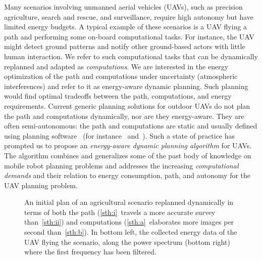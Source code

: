 \documentclass[letterpaper,10pt,conference]{ieeeconf}
\newcommand{\figpath}{./figures}
\theoremstyle{definition}
\begin{document}
Many scenarios involving unmanned aerial vehicles (UAVs), such as precision agriculture, search and rescue, and surveillance, require high autonomy but have limited energy budgets. A typical example of these scenarios is a UAV flying a path and performing some on-board computational tasks. For instance, the UAV might detect ground patterns and notify other ground-based actors with little human interaction. We refer to such computational tasks that can be dynamically replanned and adapted as \emph{computations}. We are interested in the energy optimization of the path and computations under uncertainty (atmospheric interferences) and refer to it as energy-aware dynamic planning. Such planning would find optimal tradeoffs between the path, computations, and energy requirements. Current generic planning solutions for outdoor UAVs do not plan the path and computations dynamically, nor are they energy-aware. They are often semi-autonomous: the path and computations are static and usually defined using planning software~\cite{daponte2019review} (for instance~\cite{papa} and~\cite{px4}). Such a state of practice has prompted us to propose an \emph{energy-aware dynamic planning algorithm} for UAVs. The algorithm combines and generalizes some of the past body of knowledge on mobile robot planning problems and addresses the increasing \emph{computational demands} and their relation to energy consumption, path, and autonomy for the UAV planning problem.

\begin{figure}[t]
  \centering
  \caption{An initial plan of an agricultural scenario replanned dynamically in terms of both the path (\ref{sth:i}~travels a more accurate survey than~\ref{sth:ii}) and computations (\ref{sth:a}~elaborates more images per second than~\ref{sth:b}). In bottom left, the collected energy data of the UAV flying the scenario, along the power spectrum (bottom right) where the first frequency has been filtered.}
  \label{fig:il-abs}
\end{figure}
\end{document}
